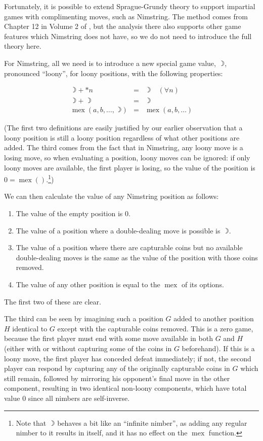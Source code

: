 \documentclass[a4paper,twocolumn]{article}
\DeclareMathOperator{\mex}{mex}
\newcommand{\loony}{\rightmoon}
\begin{document}
Fortunately, it is possible to extend Sprague-Grundy theory to support
impartial games with complimenting moves, such as Nimstring. The
method comes from Chapter 12 in Volume 2 of \cite{wways}, but the
analysis there also supports other game features which Nimstring does
not have, so we do not need to introduce the full theory here.

For Nimstring, all we need is to introduce a new special game value,
$\loony$, pronounced ``loony'', for loony positions, with the
following properties:

\begin{eqnarray*}
  \loony + *n & = & \loony \quad (\forall n)\\
  \loony + \loony & = & \loony \\
  \mex(a, b, \ldots, \loony) & = & \mex(a, b, \ldots)
\end{eqnarray*}

(The first two definitions are easily justified by our earlier
observation that a loony position is still a loony position regardless
of what other positions are added. The third comes from the fact that
in Nimstring, any loony move is a losing move, so when evaluating a
position, loony moves can be ignored: if only loony moves are
available, the first player is losing, so the value of the position is
$0 = \mex()$.\footnote{Note that $\loony$ behaves a bit like an
  ``infinite nimber'', as adding any regular nimber to it results in
  itself, and it has no effect on the $\mex$ function.})

We can then calculate the value of any Nimstring position as follows:

\begin{enumerate}
  \item The value of the empty position is $0$.
  \item The value of a position where a double-dealing move is
    possible is $\loony$.
  \item The value of a position where there are capturable coins but
    no available double-dealing moves is the same as the value of the
    position with those coins removed.
  \item The value of any other position is equal to the $\mex$ of
    its options.
\end{enumerate}

The first two of these are clear.

The third can be seen by imagining such a position $G$ added to
another position $H$ identical to $G$ except with the capturable coins
removed. This is a zero game, because the first player must end with
some move available in both $G$ and $H$ (either with or without
capturing some of the coins in $G$ beforehand). If this is a loony
move, the first player has conceded defeat immediately; if not, the
second player can respond by capturing any of the originally
capturable coins in $G$ which still remain, followed by mirroring his
opponent's final move in the other component, resulting in two
identical non-loony components, which have total value $0$ since all
nimbers are self-inverse.
\end{document}
